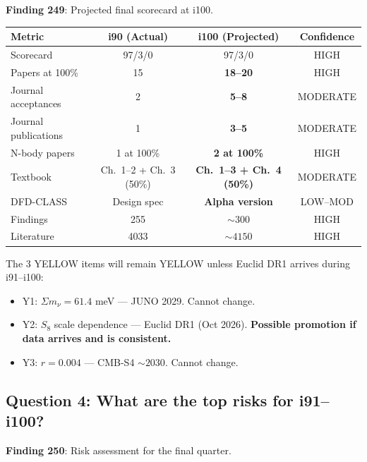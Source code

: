\documentclass[11pt,a4paper]{article}
\begin{document}
\textbf{Finding 249}: Projected final scorecard at i100.

\begin{center}
\begin{tabular}{lccc}
\toprule
\textbf{Metric} & \textbf{i90 (Actual)} & \textbf{i100 (Projected)} & \textbf{Confidence} \\
\midrule
Scorecard & 97/3/0 & 97/3/0 & HIGH \\
Papers at 100\% & 15 & \textbf{18--20} & HIGH \\
Journal acceptances & 2 & \textbf{5--8} & MODERATE \\
Journal publications & 1 & \textbf{3--5} & MODERATE \\
N-body papers & 1 at 100\% & \textbf{2 at 100\%} & HIGH \\
Textbook & Ch.\ 1--2 + Ch.\ 3 (50\%) & \textbf{Ch.\ 1--3 + Ch.\ 4 (50\%)} & MODERATE \\
DFD-CLASS & Design spec & \textbf{Alpha version} & LOW--MOD \\
Findings & 255 & \textbf{$\sim 300$} & HIGH \\
Literature & 4033 & \textbf{$\sim 4150$} & HIGH \\
\bottomrule
\end{tabular}
\end{center}

The 3 YELLOW items will remain YELLOW unless Euclid DR1 arrives during i91--i100:
\begin{itemize}[nosep]
\item Y1: $\Sigma m_\nu = 61.4$ meV --- JUNO 2029. Cannot change.
\item Y2: $S_8$ scale dependence --- Euclid DR1 (Oct 2026). \textbf{Possible promotion if data arrives and is consistent.}
\item Y3: $r = 0.004$ --- CMB-S4 $\sim 2030$. Cannot change.
\end{itemize}

\subsection{Question 4: What are the top risks for i91--i100?}

\textbf{Finding 250}: Risk assessment for the final quarter.
\end{document}
